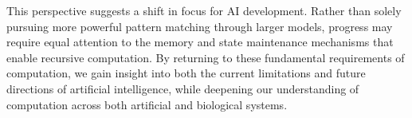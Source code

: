 \documentclass[12pt]{article}
\begin{document}
This perspective suggests a shift in focus for AI development.
Rather than solely pursuing more powerful pattern matching through larger models, progress may require equal attention to the memory and state maintenance mechanisms that enable recursive computation.
By returning to these fundamental requirements of computation, we gain insight into both the current limitations and future directions of artificial intelligence, while deepening our understanding of computation across both artificial and biological systems.

\begingroup
\footnotesize


\endgroup
\end{document}
